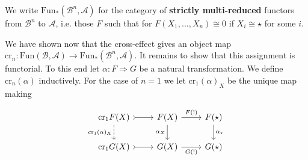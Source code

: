 \begin{defn}{}
    We write $\text{Fun}_*(\mathcal{B}^n,\mathcal{A})$ for the category of \textbf{strictly multi-reduced} functors from $\mathcal{B}^n$ to $\mathcal{A}$, i.e. those $F$ such that for $F(X_1,...,X_n)\cong 0$ if $X_i \cong \star$ for some $i$.
\end{defn}


We have shown now that the cross-effect gives an object map $\text{cr}_n:\text{Fun}(\mathcal{B},\mathcal{A})\rightarrow \text{Fun}_*(\mathcal{B}^n,\mathcal{A})$. It remains to show that this assignment is functorial. To this end let $\alpha:F\Rightarrow G$ be a natural transformation. We define $\text{cr}_n(\alpha)$ inductively. For the case of $n = 1$ we let $\text{cr}_1(\alpha)_X$ be the unique map making

\[\begin{tikzcd}
	{\text{cr}_1F(X)} & {F(X)} & {F(\star)} \\
	{\text{cr}_1G(X)} & {G(X)} & {G(\star)}
	\arrow["{F(!)}", from=1-2, to=1-3]
	\arrow["{G(!)}"', from=2-2, to=2-3]
	\arrow["{\alpha_\star}", from=1-3, to=2-3]
	\arrow["{\alpha_X}"', from=1-2, to=2-2]
	\arrow[tail, from=1-1, to=1-2]
	\arrow[tail, from=2-1, to=2-2]
	\arrow["{\text{cr}_1(\alpha)_X}"', dashed, from=1-1, to=2-1]
\end{tikzcd}\]

